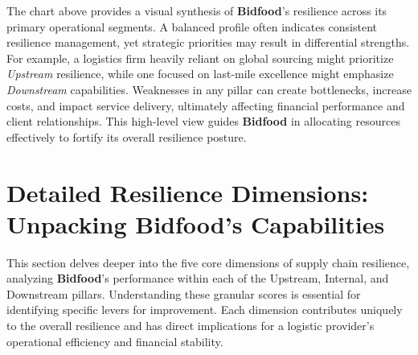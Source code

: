 \documentclass[
  oneside,
  open=any,
  fontsize=11pt]{scrbook}
\begin{document}
The chart above provides a visual synthesis of \textbf{Bidfood}'s
resilience across its primary operational segments. A balanced profile
often indicates consistent resilience management, yet strategic
priorities may result in differential strengths. For example, a
logistics firm heavily reliant on global sourcing might prioritize
\emph{Upstream} resilience, while one focused on last-mile excellence
might emphasize \emph{Downstream} capabilities. Weaknesses in any pillar
can create bottlenecks, increase costs, and impact service delivery,
ultimately affecting financial performance and client relationships.
This high-level view guides \textbf{Bidfood} in allocating resources
effectively to fortify its overall resilience posture.

\chapter{Detailed Resilience Dimensions: Unpacking Bidfood's
Capabilities}\label{detailed-resilience-dimensions-unpacking-bidfoods-capabilities}

This section delves deeper into the five core dimensions of supply chain
resilience, analyzing \textbf{Bidfood}'s performance within each of the
Upstream, Internal, and Downstream pillars. Understanding these granular
scores is essential for identifying specific levers for improvement.
Each dimension contributes uniquely to the overall resilience and has
direct implications for a logistic provider's operational efficiency and
financial stability.
\end{document}

